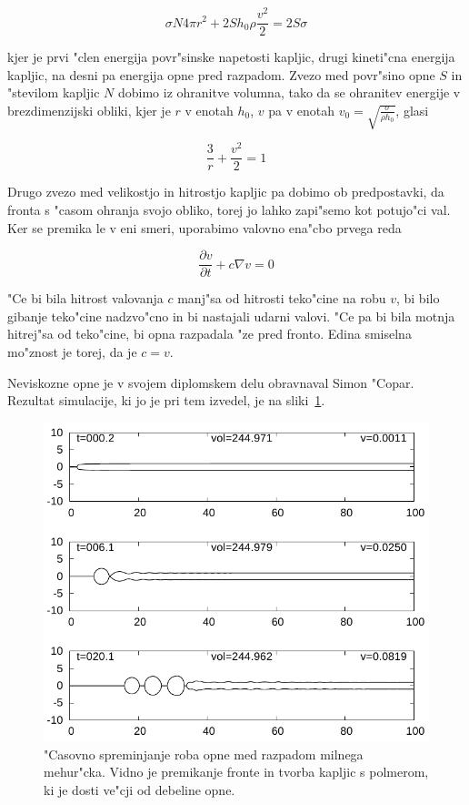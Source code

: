 \documentclass[a4paper,12pt]{article}
\begin{document}
\begin{equation}
 \sigma N 4 \pi r^2 + 2 S h_0 \rho \frac{v^2}{2} = 2S\sigma
\end{equation}

kjer je prvi "clen energija povr"sinske napetosti kapljic, drugi kineti"cna energija kapljic, na desni pa energija opne pred razpadom. Zvezo med povr"sino opne $S$ in "stevilom kapljic $N$ dobimo iz ohranitve volumna, tako da se ohranitev energije v brezdimenzijski obliki, kjer je $r$ v enotah $h_0$, $v$ pa v enotah $v_0 = \sqrt{\frac{\sigma}{\rho h_0}}$, glasi

\begin{equation}
 \frac{3}{r} + \frac{v^2}{2} = 1
\end{equation}

Drugo zvezo med velikostjo in hitrostjo kapljic pa dobimo ob predpostavki, da fronta s "casom ohranja svojo obliko, torej jo lahko zapi"semo kot potujo"ci val. Ker se premika le v eni smeri, uporabimo valovno ena"cbo prvega reda

\begin{equation}
 \frac{\partial v}{\partial t} + c \nabla v = 0
\end{equation}

"Ce bi bila hitrost valovanja $c$ manj"sa od hitrosti teko"cine na robu $v$, bi bilo gibanje teko"cine nadzvo"cno in bi nastajali udarni valovi. "Ce pa bi bila motnja hitrej"sa od teko"cine, bi opna razpadala "ze pred fronto. Edina smiselna mo"znost je torej, da je $c=v$. 

Neviskozne opne je v svojem diplomskem delu obravnaval Simon "Copar. Rezultat simulacije, ki jo je pri tem izvedel, je na sliki~\ref{fig:mehurcek-rez-1}. 

\begin{figure}[h]
  \centering
\includegraphics[width=.8\textwidth]{./Slike/mehurcek-rezultat-1}
\caption{"Casovno spreminjanje roba opne med razpadom milnega mehur"cka. Vidno je premikanje fronte in tvorba kapljic s polmerom, ki je dosti ve"cji od debeline opne.~\cite{diploma} }
\label{fig:mehurcek-rez-1}
\end{figure}
\end{document}
